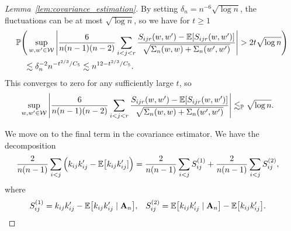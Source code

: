 \begin{proof}[Lemma~\ref{lem:covariance_estimation}]
  By setting
  $\delta_n = n^{-6} \sqrt{\log n}$,
  the fluctuations can be at most $\sqrt{\log n}$,
  so we have for $t \geq 1$
  \begin{align*}
    &\mathbb{P}\Bigg(
      \sup_{w, w' \in \mathcal{W}}
      \Bigg|
      \frac{6}{n(n-1)(n-2)}
      \sum_{i<j<r}
      \frac{S_{i j r}(w,w') - \mathbb{E}[S_{i j r}(w,w')]}
      {\sqrt{\Sigma_n(w,w) + \Sigma_n(w',w')}}
      \Bigg|
      > 2t \sqrt{\log n}
    \Bigg) \\
    &\quad\lesssim
    \delta_n^{-2}
    n^{-t^{2/3} / C_5}
    \lesssim
    n^{12-t^{2/3} / C_5}.
  \end{align*}
  This converges to zero for any sufficiently large $t$, so
  \begin{align*}
    \sup_{w, w' \in \mathcal{W}}
    \Bigg|
    \frac{6}{n(n-1)(n-2)}
    \sum_{i<j<r}
    \frac{S_{i j r}(w,w') - \mathbb{E}[S_{i j r}(w,w')]}
    {\sqrt{\Sigma_n(w,w) + \Sigma_n(w',w')}}
    \Bigg|
    &\lesssim_{\mathbb{P}}
    \sqrt{\log n}.
  \end{align*}


  We move on to the final term in
  the covariance estimator.
  We have the decomposition
  \begin{align*}
    \frac{2}{n(n-1)}
    \sum_{i<j}
    \Big(
      k_{i j} k_{i j}'
      - \mathbb{E}\big[k_{i j} k_{i j}']
    \Big)
    &=
    \frac{2}{n(n-1)}
    \sum_{i<j}
    S_{i j}^{(1)}
    +
    \frac{2}{n(n-1)}
    \sum_{i<j}
    S_{i j}^{(2)},
  \end{align*}
  where
  \begin{align*}
    S_{i j}^{(1)}
    &=
    k_{i j} k_{i j}'
    - \mathbb{E}\big[ k_{i j} k_{i j}' \mid \mathbf{A}_n \big],
    &S_{i j}^{(2)}
    &=
    \mathbb{E}\big[ k_{i j} k_{i j}' \mid \mathbf{A}_n \big]
    - \mathbb{E}\big[ k_{i j} k_{i j}' \big].
  \end{align*}



\end{proof}
